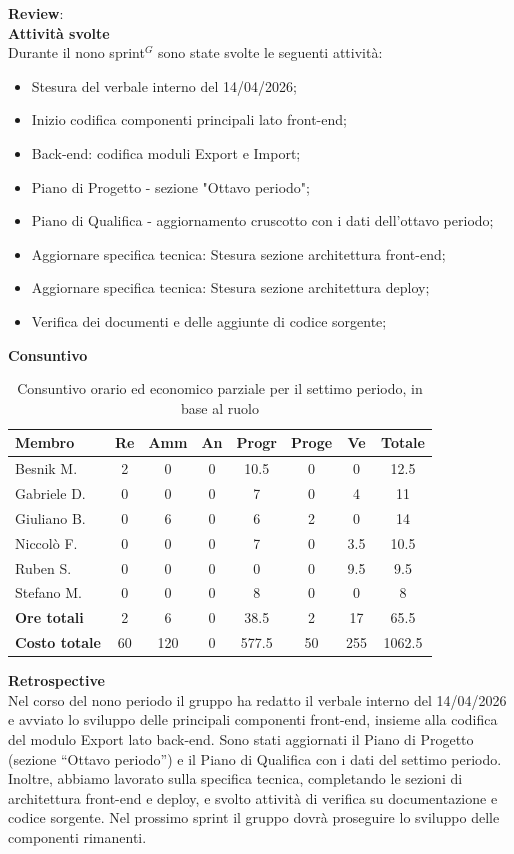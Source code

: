 \documentclass[a4paper,10pt]{article}
\begin{document}
\textbf{Review}: \\
\textbf{Attività svolte}\\
Durante il nono sprint$^G$ sono state svolte le seguenti attività:
\begin{itemize}
    \item Stesura del verbale interno del 14/04/2026;
  \item Inizio codifica componenti principali lato front-end;
  \item Back-end: codifica moduli Export e Import;
  \item Piano di Progetto - sezione "Ottavo periodo";
  \item Piano di Qualifica - aggiornamento cruscotto con i dati dell'ottavo periodo;
  \item Aggiornare specifica tecnica: Stesura sezione architettura front-end;
  \item Aggiornare specifica tecnica: Stesura sezione architettura deploy;
  \item Verifica dei documenti e delle aggiunte di codice sorgente;
\end{itemize}
\textbf{Consuntivo}
\begin{table}[H]
\centering
\begin{tabular}{|l|c|c|c|c|c|c|c|}
\hline
\textbf{Membro} & \textbf{Re} & \textbf{Amm} & \textbf{An} & \textbf{Progr} & \textbf{Proge} & \textbf{Ve} & \textbf{Totale} \\
\hline
Besnik M.   & 2   & 0   & 0 & 10.5   & 0 & 0 & 12.5 \\
Gabriele D. & 0   & 0 & 0 & 7   & 0 & 4  & 11 \\
Giuliano B. & 0   & 6   & 0 & 6   & 2 & 0  & 14 \\
Niccolò F.  & 0   & 0   & 0 & 7   & 0 & 3.5  & 10.5 \\
Ruben S.    & 0 & 0   & 0 & 0   & 0 & 9.5  & 9.5 \\
Stefano M.  & 0   & 0   & 0 & 8 & 0 & 0  & 8 \\
\hline
\textbf{Ore totali} & 2  & 6 & 0 & 38.5  & 2  & 17 & 65.5 \\
\hline
\textbf{Costo totale} & 60  & 120 &0 & 577.5  & 50  & 255 & 1062.5 \\
\hline
\end{tabular}
\caption{Consuntivo orario ed economico parziale per il settimo periodo, in base al ruolo}
\end{table}

\textbf{Retrospective} \\
Nel corso del nono periodo il gruppo ha redatto il verbale interno del 14/04/2026 e avviato lo sviluppo delle principali componenti front-end, insieme alla codifica del modulo Export lato back-end. Sono stati aggiornati il Piano di Progetto (sezione “Ottavo periodo”) e il Piano di Qualifica con i dati del settimo periodo. Inoltre, abbiamo lavorato sulla specifica tecnica, completando le sezioni di architettura front-end e deploy, e svolto attività di verifica su documentazione e codice sorgente.
Nel prossimo sprint il gruppo dovrà proseguire lo sviluppo delle componenti rimanenti.
\end{document}
